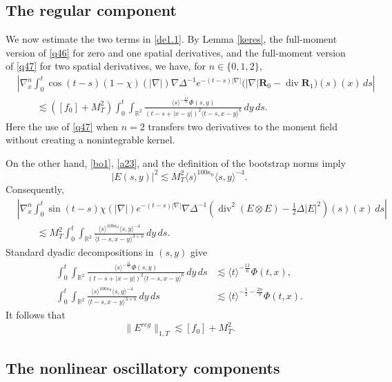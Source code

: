 \documentclass[reqno,11pt]{amsart}
\numberwithin{equation}{section}
\begin{document}
\subsection{The regular component}

We now estimate the two terms in \eqref{de1.1}. By Lemma \ref{keres}, the
full-moment version of \eqref{q46} for zero and one spatial derivatives,
and the full-moment version of \eqref{q47} for two spatial derivatives,
we have, for $n\in\{0,1,2\}$,
\begin{align*}
&\left|\nabla_x^n\int_0^t\cos(t-s)(1-\chi)(|\nabla|)
\nabla\Delta^{-1}e^{-(t-s)|\nabla|}
\big(|\nabla|\mathbf R_0-\operatorname{div}\mathbf R_1\big)(s)(x)\,ds\right|\\
&\qquad\lesssim([f_0]+M_T^2)
\int_0^t\!\!\int_{\mathbb R^2}
\frac{\langle s\rangle^{-\frac{11}{6}}\Phi(s,y)}
{(t-s+|x-y|)^2\langle t-s,x-y\rangle^6}\,dy\,ds.
\end{align*}
Here the use of \eqref{q47} when $n=2$ transfers two derivatives to the
moment field without creating a nonintegrable kernel.

On the other hand, \eqref{bo1}, \eqref{a23}, and the definition of the
bootstrap norms imply
\[
|E(s,y)|^2
\lesssim M_T^2\langle s\rangle^{100\kappa_0}
\langle s,y\rangle^{-4}.
\]
Consequently,
\begin{align*}
&\left|\nabla_x^n\int_0^t\sin(t-s)\chi(|\nabla|)e^{-(t-s)|\nabla|}
\nabla\Delta^{-1}
\left(\operatorname{div}^2(E\otimes E)-\frac12\Delta|E|^2\right)(s)(x)\,ds\right|\\
&\qquad\lesssim M_T^2
\int_0^t\!\!\int_{\mathbb R^2}
\frac{\langle s\rangle^{100\kappa_0}\langle s,y\rangle^{-4}}
{\langle t-s,x-y\rangle^{3+n}}\,dy\,ds.
\end{align*}
Standard dyadic decompositions in $(s,y)$ give
\begin{align*}
\int_0^t\!\!\int_{\mathbb R^2}
\frac{\langle s\rangle^{-\frac{11}{6}}\Phi(s,y)}
{(t-s+|x-y|)^2\langle t-s,x-y\rangle^6}\,dy\,ds
&\lesssim\langle t\rangle^{-\frac{11}{6}}\Phi(t,x),\\
\int_0^t\!\!\int_{\mathbb R^2}
\frac{\langle s\rangle^{100\kappa_0}\langle s,y\rangle^{-4}}
{\langle t-s,x-y\rangle^{3+n}}\,dy\,ds
&\lesssim\langle t\rangle^{-\frac12-\frac{2n}{3}}\Phi(t,x).
\end{align*}
It follows that
\begin{equation}\label{section6-regular-bound}
\|E^{reg}\|_{1,T}\lesssim [f_0]+M_T^2.
\end{equation}

\subsection{The nonlinear oscillatory components}
\end{document}
